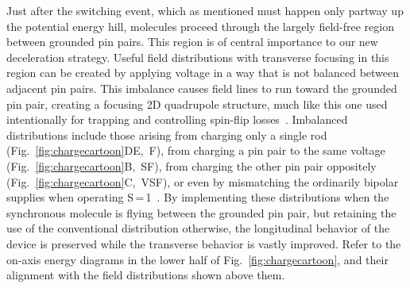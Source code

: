 \documentclass[%
 reprint,
 amsmath,amssymb,
 aps,
prl,
]{revtex4-1}
\begin{document}
Just after the switching event, which as mentioned must happen only partway up the potential energy hill, molecules proceed through the largely field-free region between grounded pin pairs.
This region is of central importance to our new deceleration strategy.
Useful field distributions with transverse focusing in this region can be created by applying voltage in a way that is not balanced between adjacent pin pairs. 
This imbalance causes field lines to run toward the grounded pin pair, creating a focusing 2D quadrupole structure, much like this one used intentionally for trapping and controlling spin-flip losses~\cite{Reens2017}.
Imbalanced distributions include those arising from charging only a single rod (Fig.~\ref{fig:chargecartoon}DE,~F), from charging a pin pair to the same voltage (Fig.~\ref{fig:chargecartoon}B,~SF), from charging the other pin pair oppositely (Fig.~\ref{fig:chargecartoon}C,~VSF), or even by mismatching the ordinarily bipolar supplies when operating S\,=\,1~\cite{Hoekstra2018}.
By implementing these distributions when the synchronous molecule is flying between the grounded pin pair, but retaining the use of the conventional distribution otherwise, the longitudinal behavior of the device is preserved while the transverse behavior is vastly improved.
Refer to the on-axis energy diagrams in the lower half of Fig.~\ref{fig:chargecartoon}, and their alignment with the field distributions shown above them.
\end{document}
